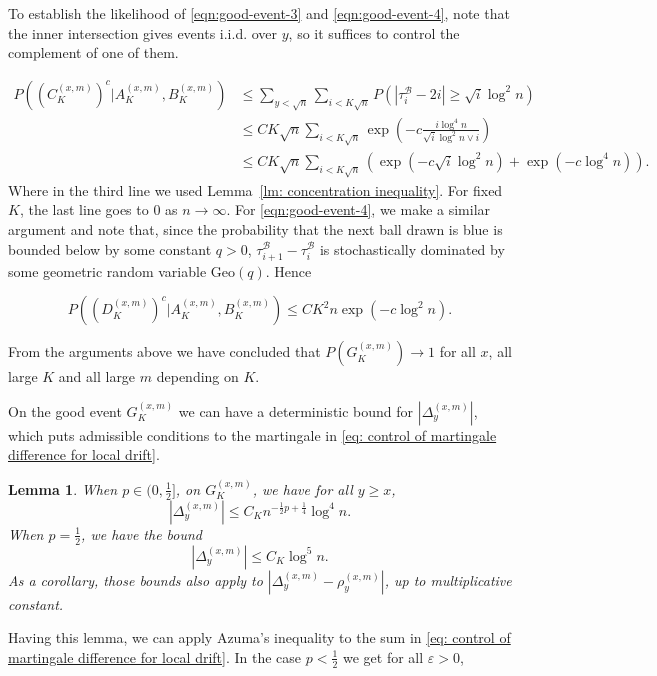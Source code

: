 \documentclass[twoside,12pt,a4paper]{article}
\newtheorem{lemma}{Lemma}[section]
\numberwithin{equation}{section}
\begin{document}
{To establish the likelihood of \eqref{eqn:good-event-3} and \eqref{eqn:good-event-4}, note that the inner intersection gives events i.i.d. over $y$, so it suffices to control the complement of one of them.

\begin{align*}
	P\left(\left( C_{K}^{(x,m)}\right)^c |A_{K}^{(x,m)}, B_K^{(x,m)}\right) 
	&\le \sum_{y < \sqrt{n} }\sum_{i < K \sqrt{ n} } P\left( |\tau_i^{\mathcal{B}} - 2i| \ge \sqrt{i} \log^2 n \right) \\
	&\le CK \sqrt{n} \sum_{i < K \sqrt{ n} } \exp\left( - c \frac{i \log^4 n}{\sqrt{i}  \log^2 n \vee i} \right)  \\
	&\le CK \sqrt{n}  \sum_{i < K \sqrt{ n} }  
	\left( \exp\left( - c \sqrt{i}  \log^2 n \right)  + 
	\exp\left( - c \log^4 n \right) \right)
.\end{align*}
Where in the third line we used Lemma~\ref{lm: concentration inequality}. For fixed $K$, the last line goes to $0$ as $n \to \infty $. For \eqref{eqn:good-event-4}, we make a similar argument and note that, since the probability that the next ball drawn is blue is bounded below by some constant $q > 0$, $\tau_{i+1}^{\mathcal{B}} - \tau_{i}^{\mathcal{B}}$ is stochastically dominated by some geometric random variable $\text{Geo}(q)$. Hence

\[
	P\left(\left( D_{K}^{(x,m)}\right)^c |A_{K}^{(x,m)}, B_K^{(x,m)}\right) 
	\le C K^2 n \exp\left( - c \log^2 n \right) 
.\] 

From the arguments above we have concluded that $P\left( G_K^{(x,m)} \right)  \to 1$ for all $x$, all large $K$ and all large $m$ depending on $K$.

On the good event $G_{K}^{(x,m)}$ we can have a deterministic bound for $|\Delta_y^{(x,m)}|$, which puts admissible conditions to the martingale in \eqref{eq: control of martingale difference for local drift}.

\begin{lemma}\label{lm:lipchitz-bound-on-good-event}
	When $p \in (0,\frac{1}{2}]$, on $G_{K}^{(x,m)}$, we have for all  $y \ge x$,
	\[
		\left| \Delta_y^{(x,m)} \right| \le C_K n^{-\frac{1}{2}p + \frac{1}{4}} \log^4 n
	.\] 
	When $p = \frac{1}{2}$, we have the bound
\[
		\left| \Delta_y^{(x,m)} \right| \le C_K \log^5 n
	.\]
	As a corollary, those bounds also apply to $\left| \Delta_y^{(x,m)} - \rho_y^{(x,m)} \right| $, up to multiplicative constant.
\end{lemma}

Having this lemma, we can apply Azuma's inequality to the sum in \eqref{eq: control of martingale difference for local drift}. In the case $p < \frac{1}{2}$ we get for all $\varepsilon>0$,

}
\end{document}
